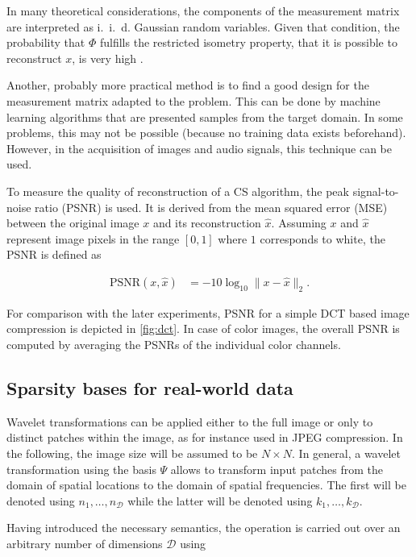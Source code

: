 \documentclass[10pt,twocolumn,a4paper]{article}
\newcommand{\iid}{i.~i.~d. }
\newcommand{\abbr}[2]{#1 (#2)}
\newcommand{\hx}{\hat x}
\newcommand{\Basis}{\Psi}
\newcommand{\Measure}{\Phi}
\newcommand{\dims}{\mathcal D}
\begin{document}
In many theoretical considerations, the components of the measurement matrix are interpreted as \iid Gaussian random variables.
Given that condition, the probability that $\Measure$ fulfills the restricted isometry property, \ie that it is possible to reconstruct $x$, is very high \cite{Donoho2006}.

Another, probably more practical method is to find a good design for the measurement matrix adapted to the problem.
This can be done by machine learning algorithms that are presented samples from the target domain.
In some problems, this may not be possible (because no training data exists beforehand).
However, in the acquisition of images and audio signals, this technique can be used.

To measure the quality of reconstruction of a CS algorithm, the \abbr{peak signal-to-noise ratio}{PSNR} is used.
It is derived from the \abbr{mean squared error}{MSE} between the original image $x$ and its reconstruction $\hx$.
Assuming $x$ and $\hx$ represent image pixels in the range $[0, 1]$ where $1$ corresponds to white, the PSNR is defined as 

\begin{align}
    \text{PSNR}(x, \hx) &= - 10 \log_{10} \|x - \hx\|_{2}.  \label{eq:psnr}
\end{align}

For comparison with the later experiments, PSNR for a simple DCT based image compression is depicted in \autoref{fig:dct}.
In case of color images, the overall PSNR is computed by averaging the PSNRs of the individual color channels.

\subsection{Sparsity bases for real-world data}

Wavelet transformations can be applied either to the full image or only to distinct patches within the image, as for instance used in JPEG compression.
In the following, the image size will be assumed to be $N \times N$.
In general, a wavelet transformation using the basis $\Basis$ allows to transform input patches from the domain of spatial locations to the domain of spatial frequencies.
The first will be denoted using $n_1, \dots, n_\dims$ while the latter will be denoted using $k_1, \dots, k_\dims$.

Having introduced the necessary semantics, the operation is carried out over an arbitrary number of dimensions $\dims$ using
\end{document}
